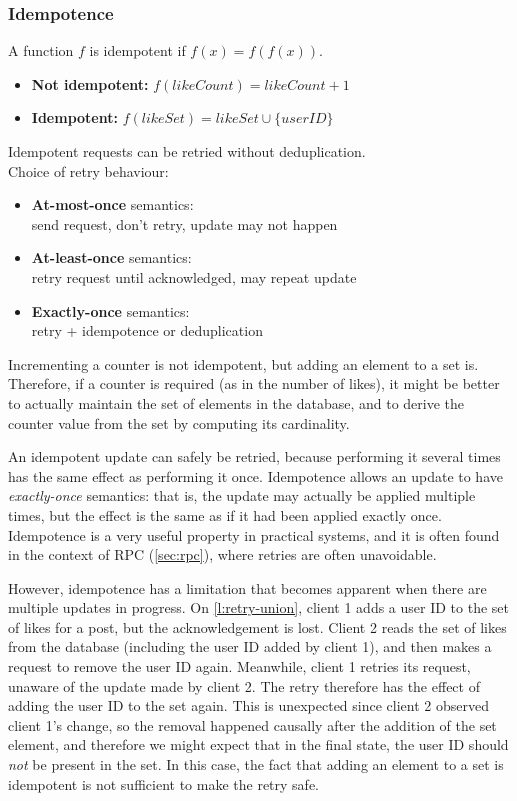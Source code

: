\begin{frame}
    \label{s:idempotence}
    \frametitle{Idempotence}
    A function $f$ is idempotent if $f(x) = f(f(x))$.
    \begin{itemize}
        \item \textbf{Not idempotent:} $f(\mathit{likeCount}) = \mathit{likeCount} + 1$
        \item \textbf{Idempotent:} $f(\mathit{likeSet}) = \mathit{likeSet} \cup \{\mathit{userID}\}$
    \end{itemize}
    Idempotent requests can be retried without deduplication.\\[1em]\pause
    Choice of retry behaviour:
    \begin{itemize}
        \item \textbf{At-most-once} semantics:\\
            send request, don't retry, update may not happen
        \item \textbf{At-least-once} semantics:\\
            retry request until acknowledged, may repeat update
        \item \textbf{Exactly-once} semantics:\\
            retry + idempotence or deduplication
    \end{itemize}
\end{frame}
\label{l:idempotence}

Incrementing a counter is not idempotent, but adding an element to a set is.
Therefore, if a counter is required (as in the number of likes), it might be better to actually maintain the set of elements in the database, and to derive the counter value from the set by computing its cardinality.

An idempotent update can safely be retried, because performing it several times has the same effect as performing it once.
Idempotence allows an update to have \emph{exactly-once} semantics: that is, the update may actually be applied multiple times, but the effect is the same as if it had been applied exactly once.
Idempotence is a very useful property in practical systems, and it is often found in the context of RPC (\autoref{sec:rpc}), where retries are often unavoidable.

However, idempotence has a limitation that becomes apparent when there are multiple updates in progress.
On \autoref{l:retry-union}, client 1 adds a user ID to the set of likes for a post, but the acknowledgement is lost.
Client 2 reads the set of likes from the database (including the user ID added by client 1), and then makes a request to remove the user ID again.
Meanwhile, client 1 retries its request, unaware of the update made by client 2.
The retry therefore has the effect of adding the user ID to the set again.
This is unexpected since client 2 observed client 1's change, so the removal happened causally after the addition of the set element, and therefore we might expect that in the final state, the user ID should \emph{not} be present in the set.
In this case, the fact that adding an element to a set is idempotent is not sufficient to make the retry safe.

